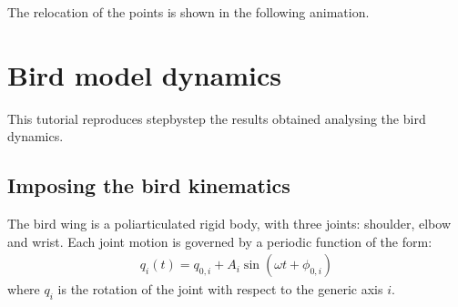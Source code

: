 \documentclass[letterpaper,10pt,english,openany,oneside]{sphinxmanual}
\begin{document}
\begin{quote}
\begin{sphinxVerbatim}[commandchars=\\\{\}]
  \PYG{p}{[}\PYG{p}{]}
  \PYG{p}{[}\PYG{p}{]}
  \PYG{p}{[}\PYG{p}{]}

  \PYG{p}{[}\PYG{p}{]}   
  \PYG{p}{[}\PYG{p}{]}   
  \PYG{p}{[}\PYG{p}{]}   
\end{sphinxVerbatim}
\end{quote}

The relocation of the points is shown in the following animation.




\section{Bird model dynamics}
\label{\detokenize{tutorial/bird_dynamics:bird-model-dynamics}}\label{\detokenize{tutorial/bird_dynamics::doc}}
This tutorial reproduces step\sphinxhyphen{}by\sphinxhyphen{}step the results obtained analysing the bird dynamics.


\subsection{Imposing the bird kinematics}
\label{\detokenize{tutorial/bird_dynamics:imposing-the-bird-kinematics}}
The bird wing is a poliarticulated rigid body, with three joints: shoulder, elbow and wrist. Each joint motion is governed by a periodic function of the form:
\begin{equation}\label{equation:tutorial/bird_dynamics:joint_kinematics}
\begin{split}q_i(t) = q_{0,i} + A_i \sin\left(\omega t + \phi_{0,i}\right)\end{split}
\end{equation}
where \(q_{i}\) is the rotation of the joint with respect to the generic axis \(i\).
\end{document}
